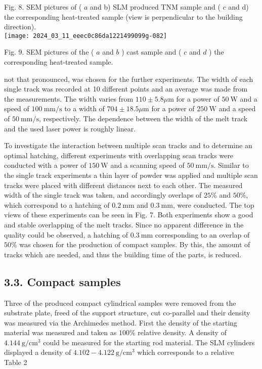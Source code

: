 \documentclass[10pt]{article}
\begin{document}
Fig. 8. SEM pictures of ( $a$ and b) SLM produced TNM sample and ( $c$ and d) the corresponding heat-treated sample (view is perpendicular to the building direction).\\
\texttt{[image: 2024\_03\_11\_eeec0c86da1221499099g-082]}

Fig. 9. SEM pictures of the ( $a$ and $b$ ) cast sample and ( $c$ and $d$ ) the corresponding heat-treated sample.

not that pronounced, was chosen for the further experiments. The width of each single track was recorded at 10 different points and an average was made from the measurements. The width varies from $110 \pm 5.8 \mu \mathrm{m}$ for a power of $50 \mathrm{~W}$ and a speed of $100 \mathrm{~mm} / \mathrm{s}$ to a width of $704 \pm 18.5 \mu \mathrm{m}$ for a power of $250 \mathrm{~W}$ and a speed of $50 \mathrm{~mm} / \mathrm{s}$, respectively. The dependence between the width of the melt track and the used laser power is roughly linear.

To investigate the interaction between multiple scan tracks and to determine an optimal hatching, different experiments with overlapping scan tracks were conducted with a power of $150 \mathrm{~W}$ and a scanning speed of $50 \mathrm{~mm} / \mathrm{s}$. Similar to the single track experiments a thin layer of powder was applied and multiple scan tracks were placed with different distances next to each other. The measured width of the single track was taken, and accordingly overlaps of $25 \%$ and $50 \%$, which correspond to a hatching of $0.2 \mathrm{~mm}$ and $0.3 \mathrm{~mm}$, were conducted. The top views of these experiments can be seen in Fig. 7. Both experiments show a good and stable overlapping of the melt tracks. Since no apparent difference in the quality could be observed, a hatching of $0.3 \mathrm{~mm}$ corresponding to an overlap of $50 \%$ was chosen for the production of compact samples. By this, the amount of tracks which are needed, and thus the building time of the parts, is reduced.

\subsection*{3.3. Compact samples}
Three of the produced compact cylindrical samples were removed from the substrate plate, freed of the support structure, cut co-parallel and their density was measured via the Archimedes method. First the density of the starting material was measured and taken as $100 \%$ relative density. A density of $4.144 \mathrm{~g} / \mathrm{cm}^{3}$ could be measured for the starting rod material. The SLM cylinders displayed a density of $4.102-4.122 \mathrm{~g} / \mathrm{cm}^{3}$ which corresponds to a relative\\
Table 2
\end{document}
